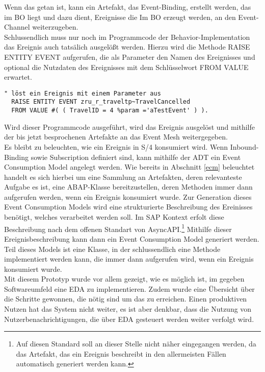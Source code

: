 Wenn das getan ist, kann ein Artefakt, das Event-Binding, erstellt werden, das im \ac{BO} liegt und dazu dient, Ereignisse die Im \ac{BO} erzeugt werden, an den Event-Channel weiterzugeben.\\
Schlussendlich muss nur noch im Programmcode der Behavior-Implementation das Ereignis auch tatsälich ausgelößt werden. Hierzu wird die Methode RAISE ENTITY EVENT aufgerufen, die als Parameter den Namen des Ereignisses und optional die Nutzdaten des Ereignisses mit dem Schlüsselwort FROM VALUE erwartet.\\

\begin{lstlisting}[language=ABAP]
  " löst ein Ereignis mit einem Parameter aus
  RAISE ENTITY EVENT zru_r_traveltp~TravelCancelled
  FROM VALUE #( ( TravelID = 4 %param ='aTestEvent' ) ).
\end{lstlisting}

Wird dieser Programmcode ausgeführt, wird das Ereignis ausgelöst und mithilfe der bis jetzt besprochenen Artefakte an das Event Mesh weitergegeben.\\

Es bleibt zu beleuchten, wie ein Ereignis in S/4 konsumiert wird. Wenn Inbound-Binding sowie Subscription definiert sind, kann mithilfe der \ac{ADT} ein Event Consumption Model angelegt werden. Wie bereits in Abschnitt \ref{ecm} beleuchtet handelt es sich hierbei um eine Sammlung an Artefakten, deren relevanteste Aufgabe es ist, eine \ac{ABAP}-Klasse bereitzustellen, deren Methoden immer dann aufgerufen werden, wenn ein Ereignis konsumiert wurde. Zur Generation dieses Event Consumption Models wird eine strukturierte Beschreibung des Ereinisses benötigt, welches verarbeitet werden soll. Im SAP Kontext erfolt diese Beschreibung nach dem offenen Standart von AsyncAPI.\footnote{Auf diesen Standard soll an dieser Stelle nicht näher eingegangen werden, da das Artefakt, das ein Ereignis beschreibt in den allermeisten Fällen automatisch generiert werden kann.} Mithilfe dieser Ereignisbeschreibung kann dann ein Event Consumption Model generiert werden. Teil dieses Models ist eine Klasse, in der schlussendlich eine Methode implementiert werden kann, die immer dann aufgerufen wird, wenn ein Ereignis konsumiert wurde.\\


Mit diesem Prototyp wurde vor allem gezeigt, wie es möglich ist, im gegeben Softwareumfeld eine \ac{EDA} zu implementieren. Zudem wurde eine Übersicht über die Schritte gewonnen, die nötig sind um das zu erreichen. 
Einen produktiven Nutzen hat das System nicht weiter, es ist aber denkbar, dass die Nutzung von Nutzerbenachrichtigungen, die über \ac{EDA} gesteuert werden weiter verfolgt wird.\\